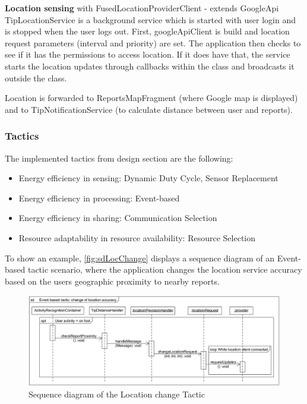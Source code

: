 \textbf{Location sensing} with FusedLocationProviderClient - extends GoogleApi
TipLocationService is a background service which is started with user login and is stopped when the user logs out. First, googleApiClient is build and location request parameters (interval and priority) are set. The application then checks to see if it has the permissions to access location. If it does have that, the service starts the location updates through callbacks within the class and broadcasts it outside the class.

Location is forwarded to ReportsMapFragment (where Google map is displayed) and to TipNotificationService (to calculate distance between user and reports).


\subsubsection{Tactics}

The implemented tactics from design section are the following:
\begin{itemize}
\item Energy efficiency in sensing: Dynamic Duty Cycle, Sensor Replacement
\item Energy efficiency in processing: Event-based
\item Energy efficiency in sharing: Communication Selection
\item Resource adaptability in resource availability: Resource Selection
\end{itemize}

To show an example, \autoref{fig:sdLocChange} displays a sequence diagram of an Event-based tactic scenario, where the application changes the location service accuracy based on the users geographic proximity to nearby reports. 

\begin{figure}[H]
\centering
\includegraphics[width=\linewidth]{images/sdDiagram2}
\caption{Sequence diagram of the Location change Tactic} \label{fig:sdLocChange}
\end{figure}


